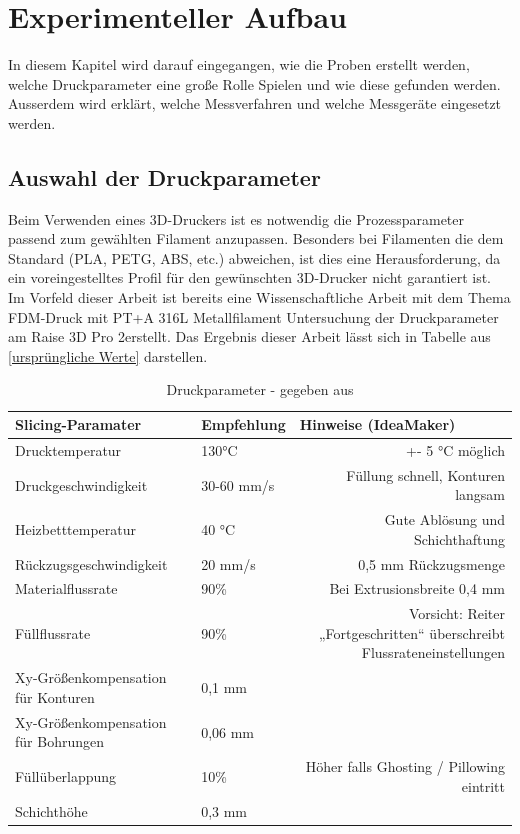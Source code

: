 \chapter{Experimenteller Aufbau}

In diesem Kapitel wird darauf eingegangen, wie die Proben erstellt werden, welche Druckparameter eine große Rolle Spielen und wie diese gefunden werden. Ausserdem wird erklärt, welche Messverfahren und welche Messgeräte eingesetzt werden.\\


\section{Auswahl der Druckparameter}
Beim Verwenden eines 3D-Druckers ist es notwendig die Prozessparameter passend zum gewählten Filament anzupassen. Besonders bei Filamenten die dem Standard (PLA, PETG, ABS, etc.) abweichen, ist dies eine Herausforderung, da ein voreingestelltes Profil für den gewünschten 3D-Drucker nicht garantiert ist. Im Vorfeld dieser Arbeit ist bereits eine Wissenschaftliche Arbeit mit dem Thema \glqq FDM-Druck mit PT+A 316L Metallfilament Untersuchung der Druckparameter am Raise 3D Pro 2\grqq erstellt. Das Ergebnis dieser Arbeit lässt sich in Tabelle aus \autoref{ursprüngliche Werte} darstellen.

\begin{table}[htbp]
    \centering
    \caption{Druckparameter - gegeben aus \autocite{M.Mickan}}
      \begin{tabular}{llr}
      \toprule
      \textbf{Slicing-Paramater} & \textbf{Empfehlung} & \multicolumn{1}{l}{\textbf{Hinweise (IdeaMaker)}} \\
      \midrule
      Drucktemperatur & 130°C & \multicolumn{1}{p{12.555em}}{+- 5 °C möglich} \\
      Druckgeschwindigkeit & 30-60 mm/s & \multicolumn{1}{p{12.555em}}{Füllung schnell, Konturen langsam} \\
      Heizbetttemperatur & 40 °C & \multicolumn{1}{p{12.555em}}{Gute Ablösung und Schichthaftung} \\
      Rückzugsgeschwindigkeit & 20 mm/s & \multicolumn{1}{p{12.555em}}{0,5 mm Rückzugsmenge} \\
      Materialflussrate & \multicolumn{1}{l}{90\%} & \multicolumn{1}{p{12.555em}}{Bei Extrusionsbreite 0,4 mm} \\
      Füllflussrate & \multicolumn{1}{l}{90\%} & \multicolumn{1}{p{12.555em}}{Vorsicht: Reiter „Fortgeschritten“ überschreibt Flussrateneinstellungen} \\
      Xy-Größenkompensation für Konturen & 0,1 mm &  \\
      Xy-Größenkompensation für Bohrungen & 0,06 mm &  \\
      Füllüberlappung & \multicolumn{1}{l}{10\%} & \multicolumn{1}{p{12.555em}}{Höher falls Ghosting / Pillowing eintritt} \\
      Schichthöhe & 0,3 mm &  \\
      \bottomrule
      \end{tabular}%
    \label{ursprüngliche Werte}%
  \end{table}%
  
